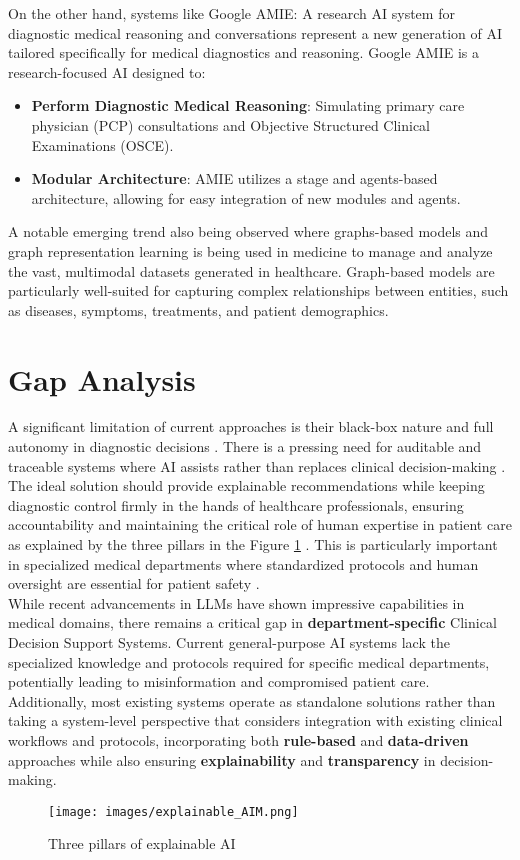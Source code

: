 \noindent On the other hand, systems like Google AMIE: A research AI system for diagnostic medical reasoning and conversations \cite{karthikesalingam2024amie} represent a new generation of AI tailored specifically for medical diagnostics and reasoning. Google AMIE is a research-focused AI designed to:
\begin{itemize}
    \item \textcolor{TUMRed}{\textbf{Perform Diagnostic Medical Reasoning}}: Simulating primary care physician (PCP) consultations and Objective Structured Clinical Examinations (OSCE).
    \item \textcolor{TUMRed}{\textbf{Modular Architecture}}: AMIE utilizes a stage and agents-based architecture, allowing for easy integration of new modules and agents.
\end{itemize}
\noindent A notable emerging trend also being observed where graphs-based models and graph representation learning \cite{johnson2024graph} is being used in medicine to manage and analyze the vast, multimodal datasets generated in healthcare. Graph-based models are particularly well-suited for capturing complex relationships between entities, such as diseases, symptoms, treatments, and patient demographics. 

\section{Gap Analysis}

\lettrine{A}{ } significant limitation of current approaches is their black-box nature and full autonomy in diagnostic decisions \cite{clusmann2023future}. There is a pressing need for auditable and traceable systems where AI assists rather than replaces clinical decision-making \cite{cohen2022intelligent}. The ideal solution should provide explainable recommendations while keeping diagnostic control firmly in the hands of healthcare professionals, ensuring accountability and maintaining the critical role of human expertise in patient care as explained by the three pillars in the Figure \ref{fig:explainable_AIM} \cite{explainableAIM}. This is particularly important in specialized medical departments where standardized protocols and human oversight are essential for patient safety \cite{cohen2022intelligent}.\\[\baselineskip]

\noindent While recent advancements in LLMs have shown impressive capabilities in medical domains, there remains a critical gap in \textcolor{TUMRed}{\textbf{department-specific}} Clinical Decision Support Systems. Current general-purpose AI systems lack the specialized knowledge and protocols required for specific medical departments, potentially leading to misinformation and compromised patient care. Additionally, most existing systems operate as standalone solutions rather than taking a system-level perspective that considers integration with existing clinical workflows and protocols, incorporating both \textcolor{TUMRed}{\textbf{rule-based}} and \textcolor{TUMRed}{\textbf{data-driven}} approaches while also ensuring \textcolor{TUMRed}{\textbf{explainability}} and \textcolor{TUMRed}{\textbf{transparency}} in decision-making.

\begin{figure}[h]
    \centering
    \texttt{[image: images/explainable\_AIM.png]}
    \caption{Three pillars of explainable AI}
    \label{fig:explainable_AIM}
\end{figure}